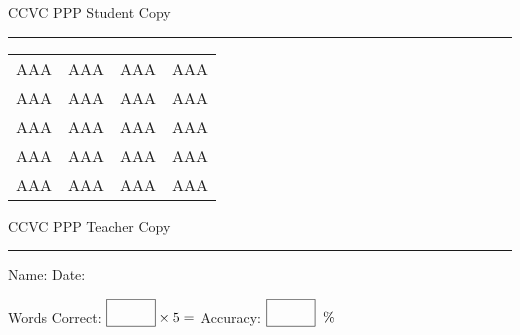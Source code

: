 \documentclass{memoir}
\begin{document}

\footnotesize \noindent
CCVC PPP \hfill Student Copy
\smallskip
\hrule

\Large

\setlength{\tabcolsep}{14pt}
\def\arraystretch{3}

{\selectfont


\begin{vplace}[0.5]
\begin{center}
\begin{tabular}{cccc}
AAA & AAA & AAA & AAA \\
AAA & AAA & AAA & AAA \\
AAA & AAA & AAA & AAA \\
AAA & AAA & AAA & AAA \\
AAA & AAA & AAA & AAA \\
\end{tabular}
\end{center}
\end{vplace}

}

\newpage

\footnotesize \noindent
CCVC PPP \hfill Teacher Copy
\smallskip
\hrule

\small

\vfill

\noindent
Name: \underline{\hspace{1.75in}} \hfill Date: \underline{\hspace{1in}}

\Large

{\selectfont



}

\small

Words Correct: $\fbox{\phantom{\huge 100}} \times 5 = $ Accuracy: $\fbox{\phantom{\huge 100}}\;\; \%$ 

\vfill

\end{document}
